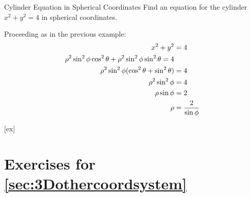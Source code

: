 \begin{example}{Cylinder Equation in Spherical Coordinates}{}
Find an equation for the cylinder $x^2+y^2=4$ in spherical
coordinates.
\end{example}
\begin{solution}
Proceeding as in the previous example:
\begin{align*}
  x^2+y^2&=4	\\
  \rho^2\sin^2\phi\cos^2\theta+
     \rho^2\sin^2\phi\sin^2\theta=4	\\
  \rho^2\sin^2\phi(\cos^2\theta+\sin^2\theta)&=4	\\
  \rho^2\sin^2\phi&=4	\\
  \rho\sin\phi&=2	\\
  \rho&={2\over\sin\phi}
\end{align*}
\end{solution}


[ex]
\section*{Exercises for \ref{sec:3Dothercoordsystem}}

